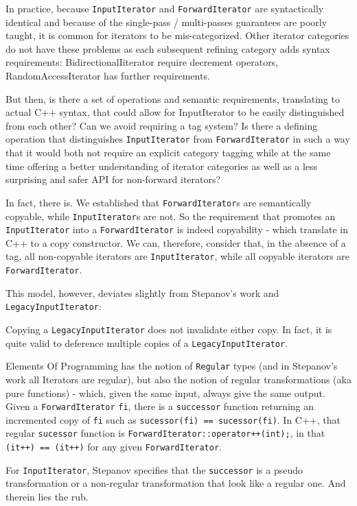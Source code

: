 \documentclass{wg21}
\begin{document}
In practice, because \texttt{InputIterator} and \texttt{ForwardIterator}
are syntactically identical and because of the single-pass /
multi-passes guarantees are poorly taught, it is common for iterators to
be mis-categorized. Other iterator categories do not have these problems
as each subsequent refining category adds syntax requirements:
BidirectionalIiterator require decrement operators, RandomAccessIterator
has further requirements.

But then, is there a set of operations and semantic requirements,
translating to actual C++ syntax, that could allow for InputIterator to
be easily distinguished from each other? Can we avoid requiring a tag
system? Is there a defining operation that distinguishes
\texttt{InputIterator} from \texttt{ForwardIterator} in such a way that
it would both not require an explicit category tagging while at the same
time offering a better understanding of iterator categories as well as a
less surprising and safer API for non-forward iterators?

In fact, there is. We established that \texttt{ForwardIterator}s are
semantically copyable, while \texttt{InputIterator}s are not. So the
requirement that promotes an \texttt{InputIterator} into a
\texttt{ForwardIterator} is indeed copyability - which translate in C++
to a copy constructor. We can, therefore, consider that, in the absence
of a tag, all non-copyable iterators are \texttt{InputIterator}, while
all copyable iterators are \texttt{ForwardIterator}.

This model, however, deviates slightly from Stepanov's work and
\texttt{LegacyInputIterator}: 

Copying a \texttt{LegacyInputIterator}
does not invalidate either copy. In fact, it is quite valid to deference
multiple copies of a \texttt{LegacyInputIterator}.

Elements Of Programming has the notion of \texttt{Regular} types (and in
Stepanov's work all Iterators are regular), but also the notion of
regular transformations (aka pure functions) - which, given the same
input, always give the same output. Given a \texttt{ForwardIterator}
\texttt{fi}, there is a \texttt{successor} function returning an
incremented copy of \texttt{fi} such as
\texttt{sucessor(fi)\ ==\ sucessor(fi)}. In C++, that regular
\texttt{sucessor} function is
\texttt{ForwardIterator::operator++(int);}, in that
\texttt{(it++)\ ==\ (it++)} for any given \texttt{ForwardIterator}.

For \texttt{InputIterator}, Stepanov specifies that the
\texttt{successor} is a pseudo transformation or a non-regular
transformation that look like a regular one. And therein lies the rub.
\end{document}
